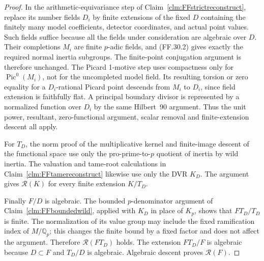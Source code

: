 \begin{proof}
In the arithmetic-equivariance step of
Claim~\ref{clm:FFstrictreconstruct}, replace
its number fields \(D_i\) by finite extensions
of the fixed \(D\) containing the finitely
many model coefficients, detector coordinates,
and actual point values. Such fields suffice
because all the fields under consideration are
algebraic over \(D\). Their completions
\(M_i\) are finite \(p\)-adic fields, and
(FF.30.2) gives exactly the required normal
inertia subgroups. The finite-point conjugation
argument is therefore unchanged. The Picard
1-motive step uses compactness only for
\(\operatorname{Pic}^0(M_i)\), not for the
uncompleted model field. Its resulting torsion
or zero equality for a \(D_i\)-rational Picard
point descends from \(M_i\) to \(D_i\), since
field extension is faithfully flat. A principal
boundary divisor is represented by a normalized
function over \(D_i\) by the same Hilbert~90
argument. Thus the unit power, resultant,
zero-functional argument, scalar removal and
finite-extension descent all apply.

For \(T_D\), the norm proof of the multiplicative
kernel and finite-image descent of the functional
space use only the pro-prime-to-\(p\) quotient
of inertia by wild inertia. The valuation and
tame-root calculations in
Claim~\ref{clm:FFtamereconstruct} likewise use
only the DVR \(K_D\). The argument gives
\(\mathcal R(K)\) for every finite extension
\(K/T_D\).

Finally \(F/D\) is algebraic. The bounded
\(p\)-denominator argument of
Claim~\ref{clm:FFboundedwild}, applied with
\(K_D\) in place of \(K_p\), shows that
\(FT_D/T_D\) is finite. The normalization of
its value group may include the fixed
ramification index of \(M/\mathbb Q_p\);
this changes the finite bound by a fixed factor
and does not affect the argument. Therefore
\(\mathcal R(FT_D)\) holds. The extension
\(FT_D/F\) is algebraic because \(D\subset F\)
and \(T_D/D\) is algebraic. Algebraic descent
proves \(\mathcal R(F)\).
\end{proof}
